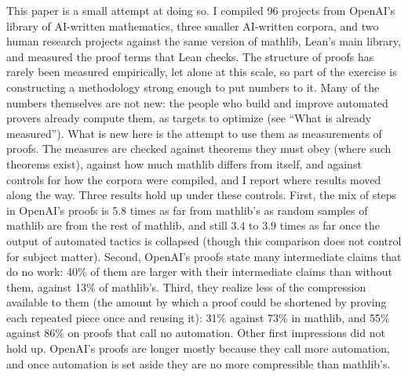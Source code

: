 \documentclass{article}
\begin{document}
This paper is a small attempt at doing so. I compiled 96 projects from OpenAI's library of AI-written mathematics,
three smaller AI-written corpora, and two human research projects against the same version of mathlib, Lean's main
library, and measured the proof terms that Lean checks. The structure of proofs has rarely been measured empirically,
let alone at this scale, so part of the exercise is constructing a methodology strong enough to put numbers to it. Many of the numbers
themselves are not new: the people who build and improve automated provers already compute them, as targets to
optimize (see ``What is already measured''). What is new here is the attempt to use them as measurements of proofs. The
measures are checked against theorems they must obey (where such theorems exist), against how much mathlib differs
from itself, and against controls for how the corpora were compiled, and I report where results moved along the way. Three results hold up under these controls.
First, the mix of steps in OpenAI's proofs is 5.8 times as far from mathlib's as random samples of mathlib are from
the rest of mathlib, and still 3.4 to 3.9 times as far once the output of automated tactics is collapsed (though this
comparison does not control for subject matter). Second, OpenAI's proofs state many intermediate claims that do no
work: 40\% of them are larger with their intermediate claims than without them, against 13\% of mathlib's. Third,
they realize less of the compression available to them (the amount by which a proof could be shortened by proving
each repeated piece once and reusing it): 31\% against 73\% in mathlib, and 55\% against 86\% on
proofs that call no automation. Other first impressions did not hold up. OpenAI's proofs are longer mostly because
they call more automation, and once automation is set aside they are no more compressible than mathlib's.
\end{document}
